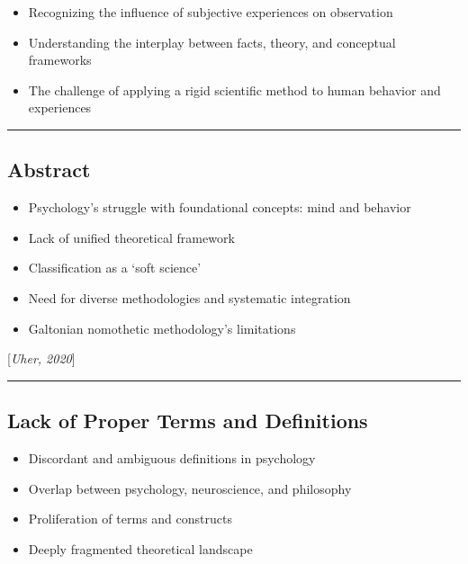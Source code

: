 \documentclass[
  letterpaper,
  DIV=11,
  numbers=noendperiod]{scrartcl}
\providecommand{\tightlist}{%
  \setlength{\itemsep}{0pt}\setlength{\parskip}{0pt}}\usepackage{longtable,booktabs,array}
\begin{document}
\begin{itemize}
\tightlist
\item
  Recognizing the influence of subjective experiences on observation
\item
  Understanding the interplay between facts, theory, and conceptual
  frameworks
\item
  The challenge of applying a rigid scientific method to human behavior
  and experiences
\end{itemize}

\begin{center}\rule{0.5\linewidth}{0.5pt}\end{center}

\subsection{Abstract}\label{abstract}

\begin{itemize}
\tightlist
\item
  Psychology's struggle with foundational concepts: mind and behavior
\item
  Lack of unified theoretical framework
\item
  Classification as a `soft science'
\item
  Need for diverse methodologies and systematic integration
\item
  Galtonian nomothetic methodology's limitations
\end{itemize}

{[}\emph{Uher, 2020}{]}

\begin{center}\rule{0.5\linewidth}{0.5pt}\end{center}

\subsection{Lack of Proper Terms and
Definitions}\label{lack-of-proper-terms-and-definitions}

\begin{itemize}
\tightlist
\item
  Discordant and ambiguous definitions in psychology
\item
  Overlap between psychology, neuroscience, and philosophy
\item
  Proliferation of terms and constructs
\item
  Deeply fragmented theoretical landscape
\end{itemize}
\end{document}
